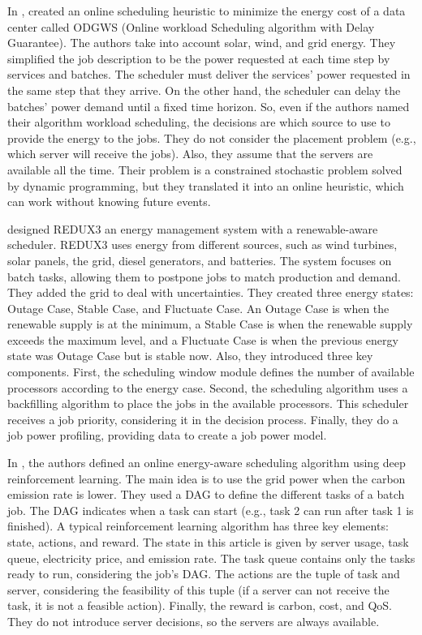 In \cite{he2022online}, \citeauthor{he2022online} created an online scheduling heuristic to minimize the energy cost of a data center called ODGWS (Online workload Scheduling algorithm with Delay Guarantee). The authors take into account solar, wind, and grid energy. They simplified the job description to be the power requested at each time step by services and batches. The scheduler must deliver the services' power requested in the same step that they arrive. On the other hand, the scheduler can delay the batches' power demand until a fixed time horizon. So, even if the authors named their algorithm workload scheduling, the decisions are which source to use to provide the energy to the jobs. They do not consider the placement problem (e.g., which server will receive the jobs). Also, they assume that the servers are available all the time. Their problem is a constrained stochastic problem solved by dynamic programming, but they translated it into an online heuristic, which can work without knowing future events.

\citeauthor{peng2022energy} designed REDUX3 an energy management system with a renewable-aware scheduler. REDUX3 uses energy from different sources, such as wind turbines, solar panels, the grid, diesel generators, and batteries. The system focuses on batch tasks, allowing them to postpone jobs to match production and demand. They added the grid to deal with uncertainties. They created three energy states: Outage Case, Stable Case, and Fluctuate Case. An Outage Case is when the renewable supply is at the minimum, a Stable Case is when the renewable supply exceeds the maximum level, and a Fluctuate Case is when the previous energy state was Outage Case but is stable now. Also, they introduced three key components. First, the scheduling window module defines the number of available processors according to the energy case. Second, the scheduling algorithm uses a backfilling algorithm to place the jobs in the available processors. This scheduler receives a job priority, considering it in the decision process. Finally, they do a job power profiling, providing data to create a job power model.

In \cite{liu2023online}, the authors defined an online energy-aware scheduling algorithm using deep reinforcement learning. The main idea is to use the grid power when the carbon emission rate is lower. They used a DAG to define the different tasks of a batch job. The DAG indicates when a task can start (e.g., task 2 can run after task 1 is finished). A typical reinforcement learning algorithm has three key elements: state, actions, and reward. The state in this article is given by server usage, task queue, electricity price, and emission rate. The task queue contains only the tasks ready to run, considering the job's DAG. The actions are the tuple of task and server, considering the feasibility of this tuple (if a server can not receive the task, it is not a feasible action). Finally, the reward is carbon, cost, and QoS. They do not introduce server decisions, so the servers are always available.

